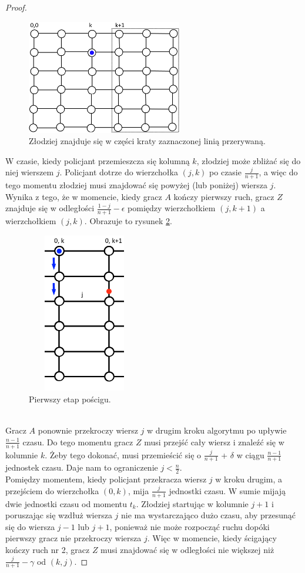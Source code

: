 \documentclass[brudnopis]{xmgr}
\theoremstyle{definition}
\begin{document}
\begin{proof}
	\begin{figure}[ht!]
	  \centering
	  \includegraphics[height=5cm]{rysunki/podsiatka.png}
	  \caption{Złodziej znajduje się w części kraty zaznaczonej linią przerywaną.}
    \label{fig:miejsceucieczki}
	\end{figure} 

	\indent W czasie, kiedy policjant przemieszcza się kolumną $k$, złodziej może zbliżać się do niej wierszem $j$. Policjant dotrze do wierzchołka $(j,k)$ po czasie $\frac{j}{n+1}$, a więc do tego momentu złodziej musi znajdować się powyżej (lub poniżej) wiersza $j$. Wynika z tego, że w momencie, kiedy gracz $A$ kończy pierwszy ruch, gracz $Z$ znajduje się w odległości $\frac{1-j}{n+1} - \epsilon$ pomiędzy wierzchołkiem $(j,k + 1)$ a wierzchołkiem $(j,k)$. Obrazuje to rysunek \ref{fig:pierwszy krok}.
	\begin{figure}[ht!]
	  \centering
	  \includegraphics[width=5cm,height=7cm]{rysunki/poscig_1.png}
	  \caption{Pierwszy etap pościgu.}
	  \label{fig:pierwszy krok}
	\end{figure}
	\\\indent Gracz $A$ ponownie przekroczy wiersz $j$ w drugim kroku algorytmu po upływie $\frac{n-1}{n+1}$ czasu. Do tego momentu gracz $Z$ musi przejść cały wiersz i znaleźć się w kolumnie $k$. Żeby tego dokonać, musi przemieścić się o $\frac{j}{n+1}$ + $\delta$ w ciągu $\frac{n-1}{n+1}$ jednostek czasu. Daje nam to ograniczenie $j < \frac{n}{2}$.
	\\\indent Pomiędzy momentem, kiedy policjant przekracza wiersz $j$ w kroku drugim, a przejściem do wierzchołka $(0,k)$, mija $\frac{j}{n+1}$ jednostki czasu. W sumie mijają dwie jednostki czasu od momentu $t_k$. Złodziej startując w kolumnie $j + 1$ i poruszając się wzdłuż wiersza $j$ nie ma wystarczająco dużo czasu, aby przesunąć się do wiersza $j - 1$ lub $j + 1$, ponieważ nie może rozpocząć ruchu dopóki pierwszy gracz nie przekroczy wiersza $j$. Więc w momencie, kiedy ścigający kończy ruch nr 2, gracz $Z$ musi znajdować się w odległości nie większej niż $\frac{j}{n+1} - \gamma$ od $(k,j)$. 


\end{proof}
\end{document}
